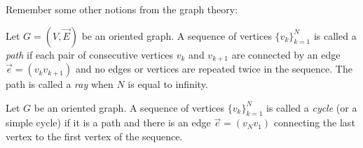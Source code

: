 \documentclass[12pt]{amsart}
\begin{document}
    Remember some other notions from the graph theory:
    \begin{definition}
      Let $G = (V, \vec{E})$ be an oriented graph.
      A sequence of vertices $\{v_k\}_{k=1}^N$ is called a \emph{path} if each pair of consecutive vertices
        $v_k$ and $v_{k+1}$ are connected by an edge $\vec{e} = (v_k v_{k+1})$ and no edges or vertices are repeated twice in the sequence.
      The path is called a \emph{ray} when $N$ is equal to infinity.
    \end{definition}
    \begin{definition}
      Let $G$ be an oriented graph.
      A sequence of vertices $\{v_k\}_{k=1}^N$ is called a \emph{cycle} (or a simple cycle) if it is
        a path and there is an edge $\vec{e} = (v_N v_1)$ connecting the last vertex to the first vertex of the sequence.
    \end{definition}
\end{document}
